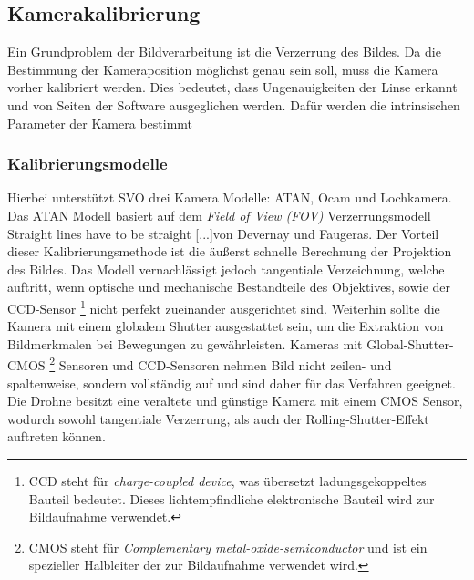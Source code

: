 \subsection{Kamerakalibrierung}
Ein Grundproblem der Bildverarbeitung ist die Verzerrung des Bildes. 
Da die Bestimmung der Kameraposition möglichst genau sein soll, muss die Kamera vorher kalibriert werden. Dies bedeutet, dass Ungenauigkeiten der Linse erkannt und von Seiten der Software ausgeglichen werden. Dafür werden die intrinsischen Parameter der Kamera bestimmt \newline

\subsubsection*{Kalibrierungsmodelle}
Hierbei unterstützt SVO drei Kamera Modelle: ATAN, Ocam und Lochkamera. \cite{svo_cameracalibration} \newline
Das ATAN Modell basiert auf dem \textit{Field of View \emph{(FOV)}} Verzerrungsmodell \grqq Straight lines have to be straight [...]\grqq von Devernay und Faugeras. \cite{calibration}\newline %
Der Vorteil dieser Kalibrierungsmethode ist die äußerst schnelle Berechnung der Projektion des Bildes.\cite{calibration2} %
Das Modell vernachlässigt jedoch tangentiale Verzeichnung, welche auftritt, wenn optische und mechanische Bestandteile des Objektives, sowie der CCD-Sensor 
\footnote{CCD steht für \emph{charge-coupled device}, was übersetzt ladungsgekoppeltes Bauteil bedeutet. Dieses lichtempfindliche elektronische Bauteil wird zur Bildaufnahme verwendet.} 
nicht perfekt zueinander ausgerichtet sind.\cite{calibration3} %
Weiterhin sollte die Kamera mit einem globalem Shutter ausgestattet sein, um die Extraktion von Bildmerkmalen bei Bewegungen zu gewährleisten. Kameras mit Global-Shutter-CMOS  
\footnote{CMOS steht für \emph{Complementary metal-oxide-semiconductor} und ist ein spezieller Halbleiter der zur Bildaufnahme verwendet wird.\cite{CMOS}} %
Sensoren und CCD-Sensoren nehmen Bild nicht zeilen- und spaltenweise, sondern vollständig auf und sind daher für das Verfahren geeignet. \newline
Die Drohne besitzt eine veraltete und günstige Kamera mit einem CMOS Sensor, wodurch sowohl tangentiale Verzerrung, als auch der Rolling-Shutter-Effekt auftreten können.\cite{developerGuide} \newline
